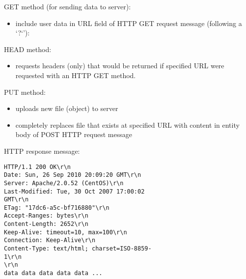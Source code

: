 \documentclass[dvipdfmx,a4paper,10pt,landscape]{article}
\begin{document}
\begin{multicols}{3}
    GET method (for sending data to
    server):
    \begin{itemize}
        \item include user data in URL field of HTTP
              GET request message (following a `?`'):
    \end{itemize}
    HEAD method:
    \begin{itemize}
        \item requests headers (only) that
              would be returned if specified
              URL were requested with an HTTP
              GET method.
    \end{itemize}
    PUT method:
    \begin{itemize}
        \item uploads new file (object) to
              server
        \item  completely replaces file that
              exists at specified URL with
              content in entity body of POST
              HTTP request message
    \end{itemize}

    HTTP response message:
    \begin{verbatim}
HTTP/1.1 200 OK\r\n
Date: Sun, 26 Sep 2010 20:09:20 GMT\r\n
Server: Apache/2.0.52 (CentOS)\r\n
Last-Modified: Tue, 30 Oct 2007 17:00:02
GMT\r\n
ETag: "17dc6-a5c-bf716880"\r\n
Accept-Ranges: bytes\r\n
Content-Length: 2652\r\n
Keep-Alive: timeout=10, max=100\r\n
Connection: Keep-Alive\r\n
Content-Type: text/html; charset=ISO-8859-
1\r\n
\r\n
data data data data data ... 
    \end{verbatim}

\end{multicols}
\end{document}
